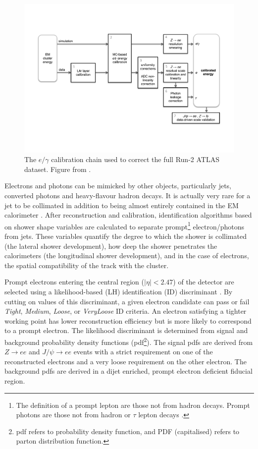 \begin{figure}[t]
    \centering
    \includegraphics[width=\textwidth]{plots/atlas/egammacali.pdf}
    \caption{The $e/\gamma$ calibration chain used to correct the full Run-2 ATLAS dataset. Figure from \cite{Atlas:egamcal_fullrun2}.\label{fig:atlas_egamcali}}
\end{figure}
Electrons and photons can be mimicked by other objects, particularly jets, converted photons and heavy-flavour hadron decays. It is actually very rare for a jet to be collimated in addition to being almost entirely contained in the EM calorimeter \cite{Atlas:egamcal_run2}. After reconstruction and calibration, identification algorithms based on shower shape variables are calculated to separate prompt\footnote{The definition of a prompt lepton are those not from hadron decays. Prompt photons are those not from hadron or $\tau$ lepton decays \cite{Atlas:truthdefs}.} electron/photons from jets. These variables quantify the degree to which the shower is collimated (the lateral shower development), how deep the shower penetrates the calorimeters (the longitudinal shower development), and in the case of electrons, the spatial compatibility of the track with the cluster.

Prompt electrons entering the central region ($|\eta|<2.47$) of the detector are selected using a likelihood-based (LH) identification (ID) discriminant \cite{Atlas:egam_reco}. By cutting on values of this discriminant, a given electron candidate can pass or fail \textit{Tight}, \textit{Medium}, \textit{Loose}, or \textit{VeryLoose} ID criteria. An electron satisfying a tighter working point has lower reconstruction efficiency but is more likely to correspond to a prompt electron. The likelihood discriminant is determined from signal and background probability density functions (pdf\footnote{pdf refers to probability density function, and PDF (capitalised) refers to parton distribution function.}). The signal pdfs are derived from $Z\rightarrow ee$ and $J/\psi\rightarrow ee$ events with a strict requirement on one of the reconstructed electrons and a very loose requirement on the other electron. The background pdfs are derived in a dijet enriched, prompt electron deficient fiducial region.


